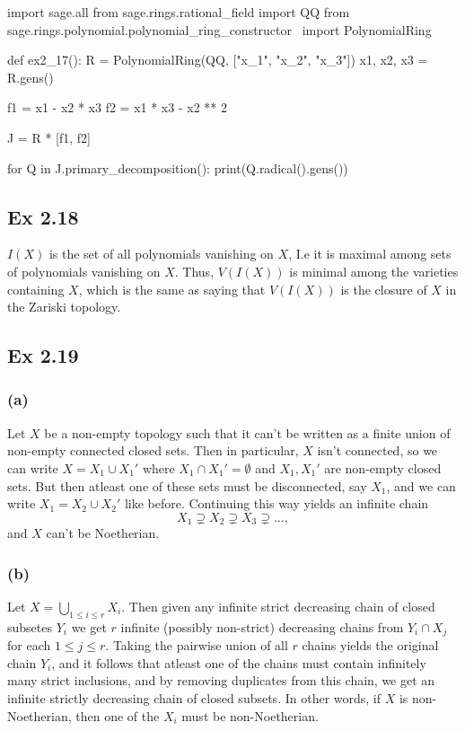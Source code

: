 \documentclass{article}
\theoremstyle{definition}
\begin{document}
\begin{python}
import sage.all
from sage.rings.rational_field import QQ
from sage.rings.polynomial.polynomial_ring_constructor \
	import PolynomialRing

def ex2_17(): 
    R = PolynomialRing(QQ, ["x_1", "x_2", "x_3"])
    x1, x2, x3 = R.gens()

    f1 = x1 - x2 * x3
    f2 = x1 * x3 - x2 ** 2
    
    J = R * [f1, f2]

    for Q in J.primary_decomposition():
        print(Q.radical().gens())
\end{python}

\subsection*{Ex 2.18}

$I(X)$ is the set of all polynomials vanishing on $X$, I.e it is maximal among
sets of polynomials vanishing on $X$. Thus, $V(I(X))$ is minimal among the
varieties containing $X$, which is the same as saying that $V(I(X))$ is the
closure of $X$ in the Zariski topology.

\subsection*{Ex 2.19}

\subsubsection*{(a)}

Let $X$ be a non-empty topology such that it can't be written as a finite union
of non-empty connected closed sets. Then in particular, $X$ isn't connected, so
we can write $X = X_1 \cup X_1'$ where $X_1 \cap X_1' = \emptyset$ and $X_1,
X_1'$ are non-empty closed sets. But then atleast one of these sets must be
disconnected, say $X_1$, and we can write $X_1 = X_2 \cup X_2'$ like before.
Continuing this way yields an infinite chain 
\[
X_1 \supsetneq X_2 \supsetneq X_3 \supsetneq \ldots,
\] 
and $X$ can't be Noetherian.

\subsubsection*{(b)}

Let $X = \bigcup_{1 \leq i \leq r} X_i$. Then given any infinite strict
decreasing chain of closed subsetes $Y_i$ we get $r$ infinite (possibly
non-strict) decreasing chains from $Y_i \cap X_j$ for each $1 \leq j \leq r$.
Taking the pairwise union of all $r$ chains yields the original chain $Y_i$,
and it follows that atleast one of the chains must contain infinitely many
strict inclusions, and by removing duplicates from this chain, we get an
infinite strictly decreasing chain of closed subsets. In other words, if $X$ is
non-Noetherian, then one of the $X_i$ must be non-Noetherian.
\end{document}
